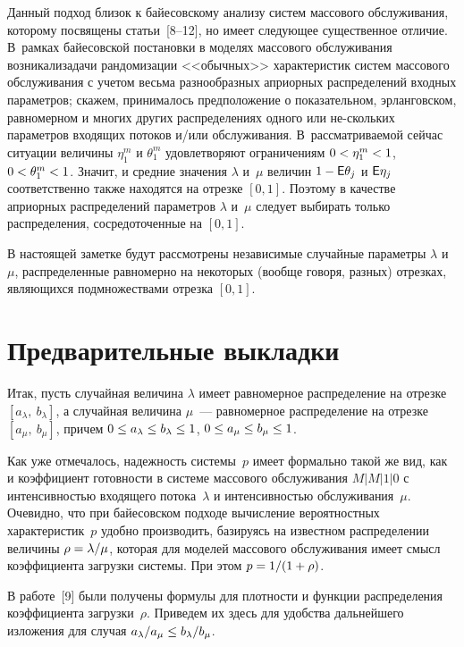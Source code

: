 \begin{multicols}{2}
Данный подход близок к байесовскому анализу систем массового
обслуживания, которому посвящены статьи~[8--12], но имеет следующее
существенное отличие. В~рамках  байесовской постанов\-ки в моделях
массового обслуживания возникали\linebreak задачи рандомизации <<обычных>>
характеристик сис\-тем массового обслуживания с учетом весьма
разнообразных априорных распределений входных параметров; скажем,
принималось предположение о показательном, эрланговском, равномерном
и многих других  распределениях одного или не-\linebreak скольких параметров
входящих потоков и/или обслуживания.  В~рассматриваемой сейчас
ситуации величины $\eta_1^m$ и $\theta_1^m$ удовлетворяют
ограничениям $0 \hm< \eta_1^m \hm< 1$, $0 \hm< \theta_1^m \hm < 1$. Значит, и
средние значения $\lambda$ и~$\mu$ величин $1 \hm- \e\theta_j$ и
${\sf E}\eta_j$ соответственно также находятся на отрезке $[0,1]$.
Поэтому в качестве априорных распределений параметров $\lambda$ и~$\mu$ следует выбирать только распределения, сосредоточенные на
$[0,1]$.

В настоящей заметке будут рассмотрены независимые случайные
параметры $\lambda$ и~$\mu$, распределенные равномерно на некоторых
(вообще \mbox{говоря}, разных) отрезках, являющихся подмножествами отрезка
$[0,1]$.

\section{Предварительные выкладки}

Итак, пусть случайная величина $\lambda$ имеет равномерное
распределение на отрезке $[a_\lambda,\ b_\lambda]$, а случайная
величина $\mu$~--- равномерное распределение на отрезке $[a_\mu,\
b_\mu]$, причем $0\hm\le a_\lambda\hm\le b_\lambda\hm\le1$, $0\hm\le a_\mu\hm\le
b_\mu\hm\le1$.

Как уже отмечалось, надежность системы~$p$ имеет формально такой же
вид, как и коэффициент готовности в системе массового обслуживания
${M}|{M}|1|0$ с интенсивностью входящего потока~$\lambda$ и интенсивностью
обслуживания~$\mu$. Очевидно, что при байесовском подходе вычисление
вероятностных характеристик~$p$ удобно производить, базируясь на
известном распределении величины $\rho\hm=\lambda/\mu$, которая для
моделей массового обслуживания имеет смысл коэффициента загрузки
системы. При этом $p\hm=1/(1\hm+\rho)$.

В работе~[9] были получены формулы для плотности и функции
распределения коэффициента загрузки~$\rho$. Приведем их здесь для
удобства дальнейшего изложения для случая $a_\lambda/a_\mu\hm\le
b_\lambda/b_\mu$.


\end{multicols}
